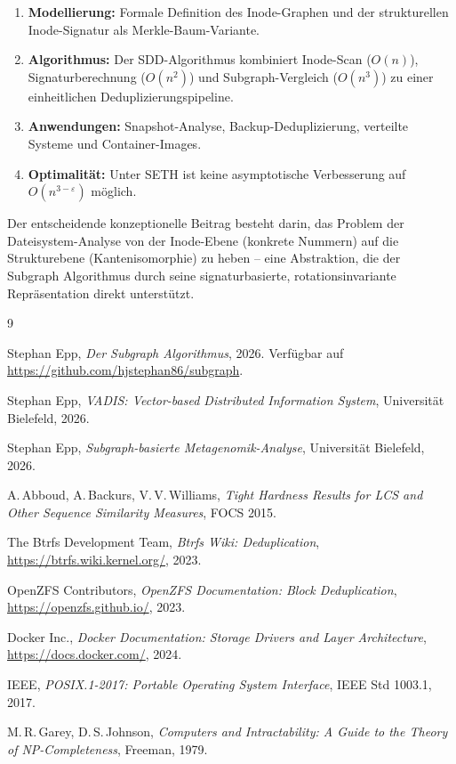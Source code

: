 ﻿\documentclass[a4paper,12pt]{article}
\theoremstyle{definition}
\begin{document}
\begin{enumerate}
    \item \textbf{Modellierung:} Formale Definition des Inode-Graphen und
          der strukturellen Inode-Signatur als Merkle-Baum-Variante.
    \item \textbf{Algorithmus:} Der SDD-Algorithmus kombiniert
          Inode-Scan ($O(n)$), Signaturberechnung ($O(n^2)$) und
          Subgraph-Vergleich ($O(n^3)$) zu einer einheitlichen
          Deduplizierungspipeline.
    \item \textbf{Anwendungen:} Snapshot-Analyse, Backup-Deduplizierung,
          verteilte Systeme und Container-Images.
    \item \textbf{Optimalit\"at:} Unter SETH ist keine asymptotische
          Verbesserung auf $O(n^{3-\varepsilon})$ m\"oglich.
\end{enumerate}

Der entscheidende konzeptionelle Beitrag besteht darin, das Problem der
Dateisystem-Analyse von der Inode-Ebene (konkrete Nummern) auf die
Strukturebene (Kantenisomorphie) zu heben -- eine Abstraktion, die der
Subgraph Algorithmus durch seine signaturbasierte, rotationsinvariante
Repr\"asentation direkt unterst\"utzt.

\begin{thebibliography}{9}

    Stephan Epp,
    \textit{Der Subgraph Algorithmus}, 2026. Verfügbar auf \url{https://github.com/hjstephan86/subgraph}.

    Stephan Epp,
    \textit{VADIS: Vector-based Distributed Information System},
    Universit\"at Bielefeld, 2026.

    Stephan Epp,
    \textit{Subgraph-basierte Metagenomik-Analyse},
    Universit\"at Bielefeld, 2026.

    A.\,Abboud, A.\,Backurs, V.\,V.\,Williams,
    \textit{Tight Hardness Results for LCS and Other Sequence Similarity
    Measures},
    FOCS 2015.

    The Btrfs Development Team,
    \textit{Btrfs Wiki: Deduplication},
    \url{https://btrfs.wiki.kernel.org/}, 2023.

    OpenZFS Contributors,
    \textit{OpenZFS Documentation: Block Deduplication},
    \url{https://openzfs.github.io/}, 2023.

    Docker Inc.,
    \textit{Docker Documentation: Storage Drivers and Layer Architecture},
    \url{https://docs.docker.com/}, 2024.

    IEEE,
    \textit{POSIX.1-2017: Portable Operating System Interface},
    IEEE Std 1003.1, 2017.

    M.\,R.\,Garey, D.\,S.\,Johnson,
    \textit{Computers and Intractability: A Guide to the Theory of
    NP-Completeness},
    Freeman, 1979.

\end{thebibliography}
\end{document}
